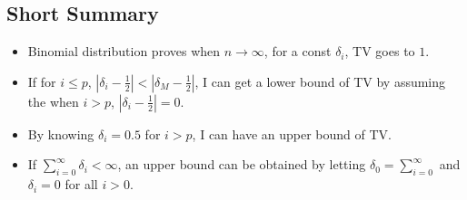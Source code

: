 \documentclass{article}
\begin{document}

\subsection{Short Summary}
\begin{itemize}
\item Binomial distribution proves when $n \rightarrow \infty$, for a const $\delta_i$, TV goes to $1$.
\item If for $i \le p$, $|\delta_i-\frac{1}{2}|<|\delta_M-\frac{1}{2}|$, I can get a lower bound of TV by assuming the when $i>p$, $|\delta_i-\frac{1}{2}| = 0$.
\item By knowing $\delta_i = 0.5$ for $i>p$, I can have an upper bound of TV. 
\item If $\sum_{i=0}^\infty \delta_i<\infty$, an upper bound can be obtained by letting $\delta_0= \sum_{i=0}^\infty$ and $\delta_i=0$ for all $i>0$. 
\end{itemize}
\end{document}
